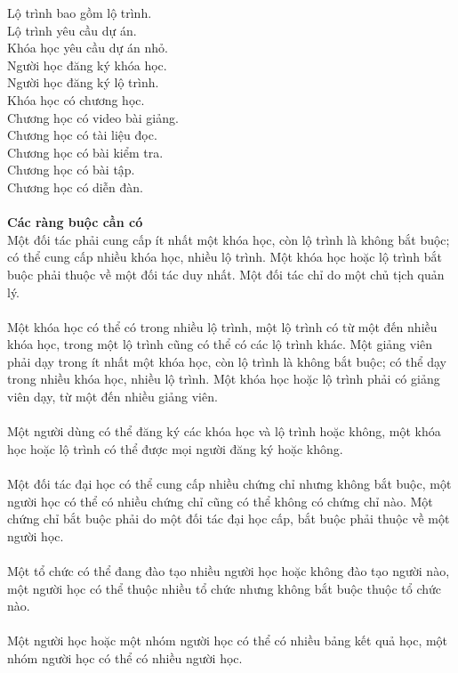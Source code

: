 \documentclass[12pt,a4paper,titlepage]{article}
\begin{document}
Lộ trình bao gồm lộ trình.\\
Lộ trình yêu cầu dự án.\\
Khóa học yêu cầu dự án nhỏ.\\
Người học đăng ký khóa học.\\
Người học đăng ký lộ trình.\\
Khóa học có chương học.\\
Chương học có video bài giảng.\\
Chương học có tài liệu đọc.\\
Chương học có bài kiểm tra.\\
Chương học có bài tập.\\
Chương học có diễn đàn.\\\\
\textbf{Các ràng buộc cần có}\\
Một đối tác phải cung cấp ít nhất một khóa học, còn lộ trình là không bắt buộc; có thể cung cấp nhiều khóa học, nhiều lộ trình. Một khóa học hoặc lộ trình bắt buộc phải thuộc về một đối tác duy nhất. Một đối tác chỉ do một chủ tịch quản lý.\\\\
Một khóa học có thể có trong nhiều lộ trình, một lộ trình có từ một đến nhiều khóa học, trong một lộ trình cũng có thể có các lộ trình khác.
Một giảng viên phải dạy trong ít nhất một khóa học, còn lộ trình là không bắt buộc; có thể dạy trong nhiều khóa học, nhiều lộ trình. Một khóa học hoặc lộ trình phải có giảng viên dạy, từ một đến nhiều giảng viên.\\\\
Một người dùng có thể đăng ký các khóa học và lộ trình hoặc không, một khóa học hoặc lộ trình có thể được mọi người đăng ký hoặc không.\\\\
Một đối tác đại học có thể cung cấp nhiều chứng chỉ nhưng không bắt buộc, một người học có thể có nhiều chứng chỉ cũng có thể không có chứng chỉ nào. Một chứng chỉ bắt buộc phải do một đối tác đại học cấp, bắt buộc phải thuộc về một người học.\\\\
Một tổ chức có thể đang đào tạo nhiều người học hoặc không đào tạo người nào, một người học có thể thuộc nhiều tổ chức nhưng không bắt buộc thuộc tổ chức nào.\\\\
Một người học hoặc một nhóm người học có thể có nhiều bảng kết quả học, một nhóm người học có thể có nhiều người học.\\\\
\end{document}
